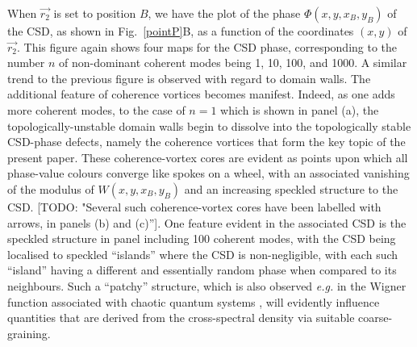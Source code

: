 \documentclass{iucr}              %
\newcommand{\todo}[1]{{\color{red}[TODO: "#1'']}}
\newcommand{\inblue}[1]{{\color{blue}#1}}
\begin{document}
When $\vec{r_2}$ is set to position $B$, we have the plot of the phase $\Phi(x,y,x_B,y_B)$ of the CSD, as shown in \inblue{Fig.~\ref{pointP}B}, as a function of the coordinates $(x,y)$ of $\vec{r_2}$.  This figure again shows four maps for the CSD phase, corresponding to the number $n$ of non-dominant coherent modes being 1, 10, 100, and 1000.  A similar trend to the previous figure is observed with regard to domain walls.  The additional feature of coherence vortices becomes manifest.  Indeed, as one adds more coherent modes, to the case of $n=1$ which is shown in panel (a), the topologically-unstable domain walls begin to dissolve into the topologically stable CSD-phase defects, namely the coherence vortices that form the key topic of the present paper. These coherence-vortex cores are evident as points upon which all phase-value colours converge like spokes on a wheel, with an associated vanishing of the modulus of $W(x,y,x_B,y_B)$ and an increasing speckled structure to the CSD.  \todo{Several such coherence-vortex cores have been labelled with arrows, in panels (b) and (c)}.  One feature evident in the associated CSD is the speckled structure in panel including 100 coherent modes, with the CSD being localised to speckled ``islands'' where the CSD is non-negligible, with each such ``island'' having a different and essentially random phase when compared to its neighbours.  Such a ``patchy'' structure, which is also observed {\em e.g.} in the Wigner function associated with chaotic quantum systems \cite{Zurek}, will evidently influence quantities that are derived from the cross-spectral density via suitable coarse-graining.
\end{document}
